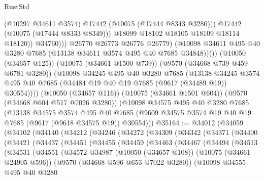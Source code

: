 \begin{lexlean}{RustStd}
\begin{coremodule}
                            (@10297 @34611 @3574)
                            @17442
                            (@10075 (@17444 @8343 @3280)))
                          @17442
                          (@10075 (@17444 @8333 @8349)))
                        @18099
                        @18102
                        @18105
                        @18109
                        @18114
                        @18120))
                    @34760)))
              @26770
              @26773
              @26776
              @26779)
            (@10098 @34611 @495 @40 @3280 @7685 (@13138 @34611 @3574 @495 @40 @7685 @34848)))))
      (@10050 (@34657 @125))
      (@10075 (@34661 @1500 @739))
      (@9570 (@34668 @739 @459 @6781 @3280))
      (@10098
        @34245
        @495
        @40
        @3280
        @7685
        (@13138
          @34245
          @3574
          @495
          @40
          @7685
          (@34484 @19 @40 @19 @7685 (@9617 (@34489 @19)) @30554))))
    (@10050 (@34657 @116))
    (@10075 (@34661 @1501 @604))
    (@9570 (@34668 @604 @517 @7026 @3280))
    (@10098
      @34575
      @495
      @40
      @3280
      @7685
      (@13138
        @34575
        @3574
        @495
        @40
        @7685
        (@9609 @34575 @3574 @19 @40 @19 @7685 (@9617 (@9618 @34575 @19)) @30554)))
@35164 := @34012
    (@34059
      (@34102
        (@34140
          (@34212
            (@34246
              (@34272
                (@34309
                  (@34342
                    (@34371
                      (@34400
                        (@34421
                          (@34437
                            (@34451
                              (@34455
                                (@34459
                                  (@34463
                                    (@34467
                                      (@34494
                                        (@34513
                                          (@34531
                                            (@34551
                                              (@34572
                                                @34987
                                                (@10050 (@34657 @108))
                                                (@10075 (@34661 @24905 @596))
                                                (@9570 (@34668 @596 @653 @7022 @3280))
                                                (@10098
                                                  @34555
                                                  @495
                                                  @40
                                                  @3280

\end{coremodule}
\end{lexlean}
